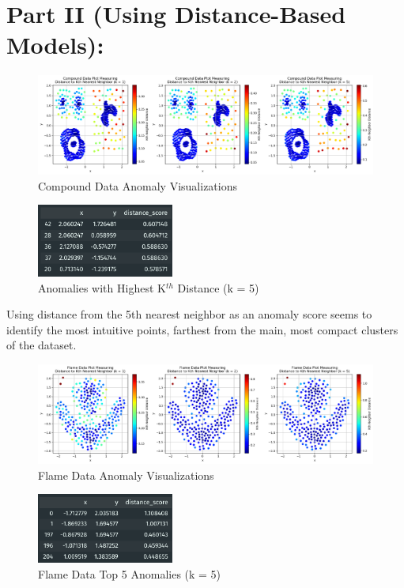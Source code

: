 \documentclass{article}
\begin{document}
\newpage

\section{Part II (Using Distance-Based Models):}
\begin{figure}[H]
    \centering
    \includegraphics[width=\textwidth]{p2_p1.png}
    \caption{Compound Data Anomaly Visualizations}
\end{figure}
\begin{figure}[H]
    \centering
    \includegraphics[width=0.4\textwidth]{p2_d1.png}
    \caption{Anomalies with Highest K$^{th}$ Distance (k = 5)}
\end{figure}

Using distance from the 5th nearest neighbor as an anomaly score seems to identify the most intuitive points,
farthest from the main, most compact clusters of the dataset.

\begin{figure}[H]
    \centering
    \includegraphics[width=\textwidth]{p2_p2.png}
    \caption{Flame Data Anomaly Visualizations}
\end{figure}
\begin{figure}[H]
    \centering
    \includegraphics[width=0.4\textwidth]{p2_d2.png}
    \caption{Flame Data Top 5 Anomalies (k = 5)}
\end{figure}
\end{document}
